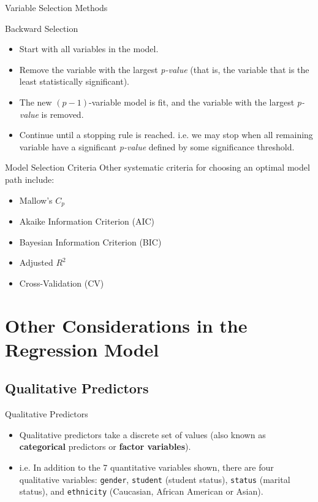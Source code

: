 \documentclass[aspectratio=169, 11pt]{beamer}
\begin{document}
\begin{frame}{Variable Selection Methods}
  \begin{block}{Backward Selection}
    \begin{itemize}
      \item Start with all variables in the model.
      \item Remove the variable with the largest \textit{p-value} (that is, the variable that is the least statistically significant).
      \item The new $(p-1)$-variable model is fit, and the variable with the largest \textit{p-value} is removed.
      \item Continue until a stopping rule is reached.  i.e. we may stop when all remaining variable have a significant \textit{p-value} defined by some significance threshold.
    \end{itemize}
  \end{block}
\end{frame}

\begin{frame}{Model Selection Criteria}
  Other systematic criteria for choosing an optimal model path include:
  \begin{itemize}
    \item Mallow's $C_p$
    \item Akaike Information Criterion (AIC)
    \item Bayesian Information Criterion (BIC)
    \item Adjusted $R^2$
    \item Cross-Validation (CV)
  \end{itemize}
\end{frame}

\section{Other Considerations in the Regression Model}

\subsection{Qualitative Predictors}

\begin{frame}{Qualitative Predictors}
  \begin{itemize}
    \item Qualitative predictors take a discrete set of values (also known as \textbf{categorical} predictors or \textbf{factor variables}).
    \item i.e. In addition to the 7 quantitative variables shown, there are four qualitative variables: \texttt{gender}, \texttt{student} (student status), \texttt{status} (marital status), and \texttt{ethnicity} (Caucasian, African American or Asian).
  \end{itemize}
\end{frame}
\end{document}
